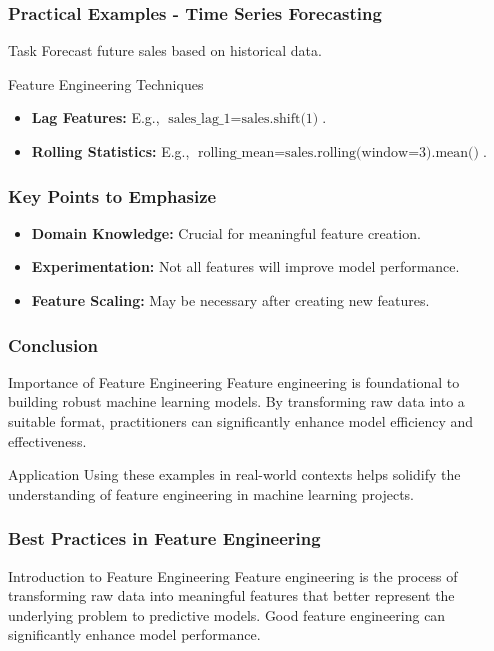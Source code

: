 \documentclass[aspectratio=169]{beamer}
\begin{document}
\begin{frame}[fragile]
  \frametitle{Practical Examples - Time Series Forecasting}
  \begin{block}{Task}
    Forecast future sales based on historical data.
  \end{block}
  \begin{block}{Feature Engineering Techniques}
    \begin{itemize}
      \item \textbf{Lag Features:} E.g., \( \text{sales\_lag\_1} = \text{sales.shift(1)} \).
      \item \textbf{Rolling Statistics:} E.g., \( \text{rolling\_mean} = \text{sales.rolling(window=3).mean()} \).
    \end{itemize}
  \end{block}
\end{frame}

\begin{frame}[fragile]
  \frametitle{Key Points to Emphasize}
  \begin{itemize}
    \item \textbf{Domain Knowledge:} Crucial for meaningful feature creation.
    \item \textbf{Experimentation:} Not all features will improve model performance.
    \item \textbf{Feature Scaling:} May be necessary after creating new features.
  \end{itemize}
\end{frame}

\begin{frame}[fragile]
  \frametitle{Conclusion}
  \begin{block}{Importance of Feature Engineering}
    Feature engineering is foundational to building robust machine learning models. By transforming raw data into a suitable format, practitioners can significantly enhance model efficiency and effectiveness.
  \end{block}
  \begin{block}{Application}
    Using these examples in real-world contexts helps solidify the understanding of feature engineering in machine learning projects.
  \end{block}
\end{frame}

\begin{frame}
    \frametitle{Best Practices in Feature Engineering}
    \begin{block}{Introduction to Feature Engineering}
        Feature engineering is the process of transforming raw data into meaningful features that better represent the underlying problem to predictive models. Good feature engineering can significantly enhance model performance.
    \end{block}
\end{frame}
\end{document}
